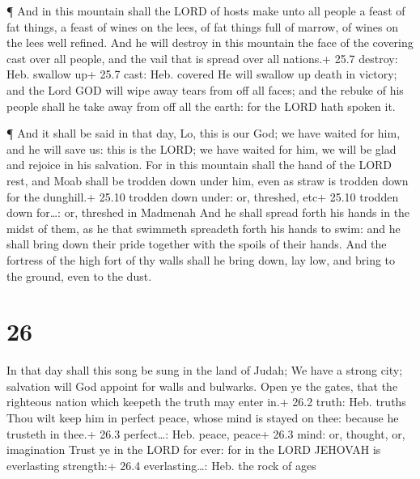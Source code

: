  ¶ And in this mountain shall the LORD of hosts make unto
all people a feast of fat things, a feast of wines on the lees, of fat
things full of marrow, of wines on the lees well refined. 
And he will destroy in this mountain the face of the covering cast over
all people, and the vail that is spread over all nations.+ 25.7 destroy:
Heb. swallow up+ 25.7 cast: Heb. covered  He will swallow up
death in victory; and the Lord GOD will wipe away tears from off all
faces; and the rebuke of his people shall he take away from off all the
earth: for the LORD hath spoken it.

 ¶ And it shall be said in that day, Lo, this is our God; we
have waited for him, and he will save us: this is the LORD; we have
waited for him, we will be glad and rejoice in his salvation.
 For in this mountain shall the hand of the LORD rest, and
Moab shall be trodden down under him, even as straw is trodden down for
the dunghill.+ 25.10 trodden down under: or, threshed, etc+ 25.10
trodden down for\ldots: or, threshed in Madmenah  And he
shall spread forth his hands in the midst of them, as he that swimmeth
spreadeth forth his hands to swim: and he shall bring down their pride
together with the spoils of their hands.  And the fortress
of the high fort of thy walls shall he bring down, lay low, and bring to
the ground, even to the dust.

\hypertarget{section-25}{%
\section{26}\label{section-25}}

 In that day shall this song be sung in the land of Judah;
We have a strong city; salvation will God appoint for walls and
bulwarks.  Open ye the gates, that the righteous nation
which keepeth the truth may enter in.+ 26.2 truth: Heb. truths
 Thou wilt keep him in perfect peace, whose mind is stayed
on thee: because he trusteth in thee.+ 26.3 perfect\ldots: Heb. peace,
peace+ 26.3 mind: or, thought, or, imagination  Trust ye in
the LORD for ever: for in the LORD JEHOVAH is everlasting strength:+
26.4 everlasting\ldots: Heb. the rock of ages

